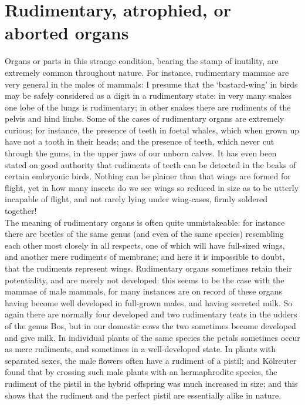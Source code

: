 \section{Rudimentary, atrophied, or aborted organs}
\indent Organs or parts in this strange condition, bearing the stamp of inutility, are extremely common throughout nature. For instance, rudimentary mammae are very general in the males of mammals: I presume that the `bastard-wing' in birds may be safely considered as a digit in a rudimentary state: in very many snakes one lobe of the lungs is rudimentary; in other snakes there are rudiments of the pelvis and hind limbs. Some of the cases of rudimentary organs are extremely curious; for instance, the presence of teeth in foetal whales, which when grown up have not a tooth in their heads; and the presence of teeth, which never cut through the gums, in the upper jaws of our unborn calves. It has even been stated on good authority that rudiments of teeth can be detected in the beaks of certain embryonic birds. Nothing can be plainer than that wings are formed for flight, yet in how many insects do we see wings so reduced in size as to be utterly incapable of flight, and not rarely lying under wing-cases, firmly soldered together!~\\
\indent The meaning of rudimentary organs is often quite unmistakeable: for instance there are beetles of the same genus (and even of the same species) resembling each other most closely in all respects, one of which will have full-sized wings, and another mere rudiments of membrane; and here it is impossible to doubt, that the rudiments represent wings. Rudimentary organs sometimes retain their potentiality, and are merely not developed: this seems to be the case with the mammae of male mammals, for many instances are on record of these organs having become well developed in full-grown males, and having secreted milk. So again there are normally four developed and two rudimentary teats in the udders of the genus Bos, but in our domestic cows the two sometimes become developed and give milk. In individual plants of the same species the petals sometimes occur as mere rudiments, and sometimes in a well-developed state. In plants with separated sexes, the male flowers often have a rudiment of a pistil; and K\"{o}lreuter found that by crossing such male plants with an hermaphrodite species, the rudiment of the pistil in the hybrid offspring was much increased in size; and this shows that the rudiment and the perfect pistil are essentially alike in nature.~\\
